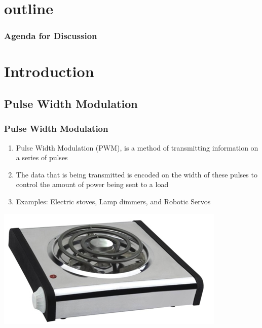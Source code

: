 \documentclass[10pt,red]{beamer}
\title
[
	Firebird LPC2148 Robotics Research Platform	%
	\hspace{0.5cm}
	\insertframenumber/\inserttotalframenumber
]
{
	DC Motor Velocity Control \\Using Pulse Width Modulation (PWM)
}
\author
[
	www.e-yantra.org
]
{
	e-Yantra Team \\[20pt]
  Embedded Real-Time Systems Lab\\
  Indian Institute of Technology-Bombay \\
}
\date
{
IIT Bombay \\ {\today}
}
\begin{document}
  

\begin{frame}
   \titlepage
\end{frame}

\section*{outline}
\begin{frame}
	\frametitle{Agenda for Discussion}
	\tableofcontents
\end{frame}

\section{Introduction}
\subsection{Pulse Width Modulation}
\begin{frame}
	\frametitle{Pulse Width Modulation} \pause
		\begin{enumerate}
			\item<+-|alert@+> Pulse Width Modulation (PWM), is a method of transmitting information on a series of pulses \\[10pt]
			\item<+-|alert@+> The data that is being transmitted is encoded on the width of these pulses to control the amount of power being sent to a load \\[10pt]
			\item<+-|alert@+> Examples: Electric stoves, Lamp dimmers, and Robotic Servos \\[10pt]
		\end{enumerate} \pause
		\includegraphics[width = 0.5\linewidth]{electric_stove} 
\end{frame}
\end{document}
